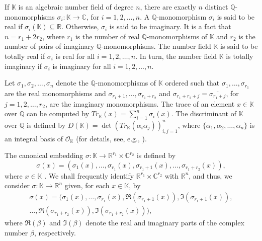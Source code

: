 \documentclass[10pt,a4paper]{amsart}
\begin{document}
If $\mathbb{K}$ is an algebraic number field of degree $n$, there are exactly $n$ distinct $\mathbb{Q}$-monomorphisms $\sigma_i:\mathbb{K}\rightarrow\mathbb{C}$, for $i=1,2,\ldots,n$. A $\mathbb{Q}$-monomorphism $\sigma_i$ is said to be real if $\sigma_i(\mathbb{K})\subseteq\mathbb{R}$. Otherwise, $\sigma_i$ is said to be imaginary. It is a fact that $n=r_1+2r_2$, where $r_1$ is the number of real $\mathbb{Q}$-monomorphisms of $\mathbb{K}$ and $r_2$ is the number of pairs of imaginary $\mathbb{Q}$-monomorphisms. The number field $\mathbb{K}$ is said to be totally real if $\sigma_i$ is real for all $i=1,2,\ldots,n$. In turn, the number field $\mathbb{K}$ is totally imaginary if $\sigma_i$ is imaginary for all $i=1,2,\ldots,n$. 

Let $\sigma_1,\sigma_2,\ldots,\sigma_n$ denote the $\mathbb{Q}$-monomorphisms of $\mathbb{K}$ ordered such that $\sigma_1,\ldots,\sigma_{r_1}$ are the real monomorphisms and $\sigma_{r_1+1},\ldots,\sigma_{r_1+r_2}$ and $\sigma_{r_1+r_2+j}=\overline{\sigma_{r_1+j}}$, for $j=1,2,\ldots,r_2$, are the imaginary monomorphisms. The trace of an element $x\in\mathbb{K}$ over $\mathbb{Q}$ can be computed by $Tr_{\mathbb{K}}(x)=\sum_{i=1}^n\sigma_i(x)$. The discriminant of $\mathbb{K}$ over $\mathbb{Q}$ is defined by $D(\mathbb{K})=\det(Tr_{\mathbb{K}}(\alpha_i\alpha_j))_{i,j=1}^n$, where $\{\alpha_1,\alpha_2,\ldots,\alpha_n\}$ is an integral basis of $\mathcal{O}_{\mathbb{K}}$ (for details, see, e.g., \cite{samuel}). 

The canonical embedding $\sigma:\mathbb{K}\rightarrow\mathbb{R}^{r_1}\times\mathbb{C}^{r_2}$ is defined by  \[ \sigma(x) = (\sigma_1(x),\ldots,\sigma_{r_1}(x),\sigma_{r_1+1}(x),\ldots,\sigma_{r_1+r_2}(x)), \] where $x\in\mathbb{K}$ \cite[Section 4.2]{samuel}. We shall frequently identify $\mathbb{R}^{r_1}\times\mathbb{C}^{r_2}$ with $\mathbb{R}^n$, and thus, we consider $\sigma:\mathbb{K}\rightarrow\mathbb{R}^{n}$ given, for each $x\in \mathbb{K}$, by %
\begin{multline*} \sigma(x) = (\sigma_1(x),\ldots,\sigma_{r_1}(x),\mathfrak{R}(\sigma_{r_1+1}(x)),\mathfrak{I}(\sigma_{r_1+1}(x)),\\  \ldots,\mathfrak{R}(\sigma_{r_1+r_2}(x)),\mathfrak{I}(\sigma_{r_1+r_2}(x))), \end{multline*}
where $\mathfrak{R}(\beta)$ and $\mathfrak{I}(\beta)$ denote the real and imaginary parts of the complex number $\beta$, respectively.
\end{document}

